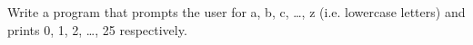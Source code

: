 Write a program that prompts the user for a, b, c, \ldots, z (i.e. lowercase letters) and prints 0, 1, 2, \ldots, 25 respectively.

